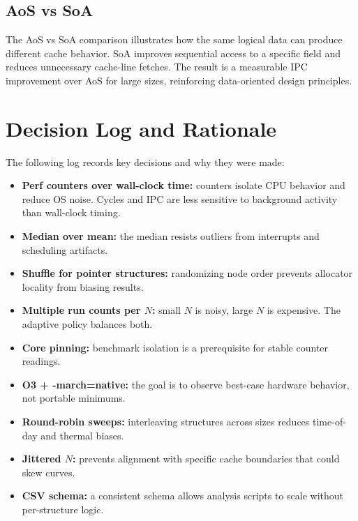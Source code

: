 \documentclass[11pt]{article}
\begin{document}
\subsection{AoS vs SoA}
The AoS vs SoA comparison illustrates how the same logical data can produce different cache behavior. SoA improves sequential access to a specific field and reduces unnecessary cache-line fetches. The result is a measurable IPC improvement over AoS for large sizes, reinforcing data-oriented design principles.

\section{Decision Log and Rationale}
The following log records key decisions and why they were made:
\begin{itemize}
    \item \textbf{Perf counters over wall-clock time:} counters isolate CPU behavior and reduce OS noise. Cycles and IPC are less sensitive to background activity than wall-clock timing.
    \item \textbf{Median over mean:} the median resists outliers from interrupts and scheduling artifacts.
    \item \textbf{Shuffle for pointer structures:} randomizing node order prevents allocator locality from biasing results.
    \item \textbf{Multiple run counts per \(N\):} small \(N\) is noisy, large \(N\) is expensive. The adaptive policy balances both.
    \item \textbf{Core pinning:} benchmark isolation is a prerequisite for stable counter readings.
    \item \textbf{O3 + -march=native:} the goal is to observe best-case hardware behavior, not portable minimums.
    \item \textbf{Round-robin sweeps:} interleaving structures across sizes reduces time-of-day and thermal biases.
    \item \textbf{Jittered \(N\):} prevents alignment with specific cache boundaries that could skew curves.
    \item \textbf{CSV schema:} a consistent schema allows analysis scripts to scale without per-structure logic.
\end{itemize}
\end{document}
